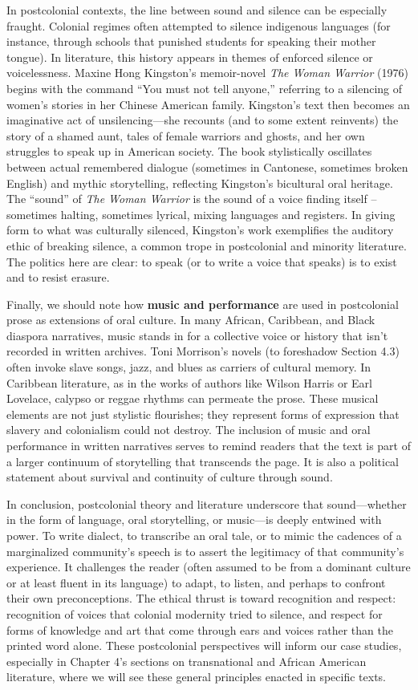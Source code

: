 \documentclass[12pt]{report}
\begin{document}
In postcolonial contexts, the line between sound and silence can be especially fraught. Colonial regimes often attempted to silence indigenous languages (for instance, through schools that punished students for speaking their mother tongue). In literature, this history appears in themes of enforced silence or voicelessness. Maxine Hong Kingston’s memoir-novel \textit{The Woman Warrior} (1976) begins with the command “You must not tell anyone,” referring to a silencing of women’s stories in her Chinese American family. Kingston’s text then becomes an imaginative act of unsilencing—she recounts (and to some extent reinvents) the story of a shamed aunt, tales of female warriors and ghosts, and her own struggles to speak up in American society. The book stylistically oscillates between actual remembered dialogue (sometimes in Cantonese, sometimes broken English) and mythic storytelling, reflecting Kingston’s bicultural oral heritage. The “sound” of \textit{The Woman Warrior} is the sound of a voice finding itself – sometimes halting, sometimes lyrical, mixing languages and registers. In giving form to what was culturally silenced, Kingston’s work exemplifies the auditory ethic of breaking silence, a common trope in postcolonial and minority literature. The politics here are clear: to speak (or to write a voice that speaks) is to exist and to resist erasure.

Finally, we should note how \textbf{music and performance} are used in postcolonial prose as extensions of oral culture. In many African, Caribbean, and Black diaspora narratives, music stands in for a collective voice or history that isn’t recorded in written archives. Toni Morrison’s novels (to foreshadow Section 4.3) often invoke slave songs, jazz, and blues as carriers of cultural memory. In Caribbean literature, as in the works of authors like Wilson Harris or Earl Lovelace, calypso or reggae rhythms can permeate the prose. These musical elements are not just stylistic flourishes; they represent forms of expression that slavery and colonialism could not destroy. The inclusion of music and oral performance in written narratives serves to remind readers that the text is part of a larger continuum of storytelling that transcends the page. It is also a political statement about survival and continuity of culture through sound.

In conclusion, postcolonial theory and literature underscore that sound—whether in the form of language, oral storytelling, or music—is deeply entwined with power. To write dialect, to transcribe an oral tale, or to mimic the cadences of a marginalized community’s speech is to assert the legitimacy of that community’s experience. It challenges the reader (often assumed to be from a dominant culture or at least fluent in its language) to adapt, to listen, and perhaps to confront their own preconceptions. The ethical thrust is toward recognition and respect: recognition of voices that colonial modernity tried to silence, and respect for forms of knowledge and art that come through ears and voices rather than the printed word alone. These postcolonial perspectives will inform our case studies, especially in Chapter 4’s sections on transnational and African American literature, where we will see these general principles enacted in specific texts.
\end{document}
